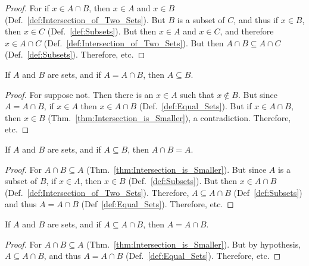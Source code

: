         \begin{proof}
            For if $x\in{A}\cap{B}$, then $x\in{A}$ and
            $x\in{B}$ (Def.~\ref{def:Intersection_of_Two_Sets}).
            But $B$ is a subset of $C$, and thus if
            $x\in{B}$, then $x\in{C}$
            (Def.~\ref{def:Subsets}). But then $x\in{A}$ and
            $x\in{C}$, and therefore $x\in{A}\cap{C}$
            (Def.~\ref{def:Intersection_of_Two_Sets}). But
            then $A\cap{B}\subseteq{A}\cap{C}$
            (Def.~\ref{def:Subsets}). Therefore, etc.
        \end{proof}
        \begin{theorem}
            \label{thm:Intersection_is_Equal}%
            If $A$ and $B$ are sets, and if
            $A=A\cap{B}$, then $A\subseteq{B}$.
        \end{theorem}
        \begin{proof}
            For suppose not. Then there is an $x\in{A}$ such
            that $x\notin{B}$. But since $A=A\cap{B}$,
            if $x\in{A}$ then $x\in{A}\cap{B}$
            (Def.~\ref{def:Equal_Sets}). But if
            $x\in{A}\cap{B}$, then $x\in{B}$
            (Thm.~\ref{thm:Intersection_is_Smaller}),
            a contradiction. Therefore, etc.
        \end{proof}
        \begin{theorem}
            \label{thm:Intersection_of_Subset}%
            If $A$ and $B$ are sets, and if
            $A\subseteq{B}$, then $A\cap{B}=A$.
        \end{theorem}
        \begin{proof}
            For $A\cap{B}\subseteq{A}$
            (Thm.~\ref{thm:Intersection_is_Smaller}). But
            since $A$ is a subset of $B$, if $x\in{A}$, then
            $x\in{B}$ (Def.~\ref{def:Subsets}). But then
            $x\in{A}\cap{B}$
            (Def.~\ref{def:Intersection_of_Two_Sets}). Therefore,
            $A\subseteq{A}\cap{B}$ (Def~\ref{def:Subsets})
            and thus $A=A\cap{B}$ (Def~\ref{def:Equal_Sets}).
            Therefore, etc.
        \end{proof}
        \begin{theorem}
            \label{thm:Conv_Intersection_is_Smaller}%
            If $A$ and $B$ are sets, and if
            $A\subseteq{A}\cap{B}$, then $A=A\cap{B}$.
        \end{theorem}
        \begin{proof}
            For $A\cap{B}\subseteq{A}$
            (Thm.~\ref{thm:Intersection_is_Smaller}). But
            by hypothesis, $A\subseteq{A}\cap{B}$, and thus
            $A=A\cap{B}$ (Def.~\ref{def:Equal_Sets}).
            Therefore, etc.
        \end{proof}
